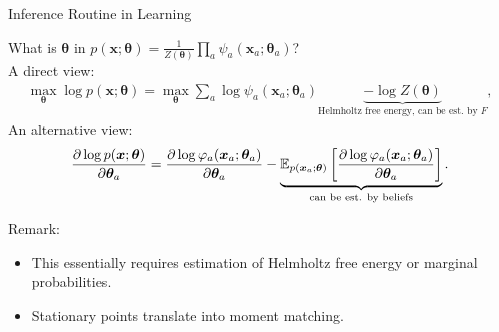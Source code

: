 \begin{frame}[label=current]{\large Inference Routine in Learning}
  
  What is $\bm{\theta}$ in $p(\bm{x}; \bm{\theta}) = \frac{1}{Z(\bm{\theta})} \prod_{a} \psi_a(\bm{x}_a; \bm{\theta}_a)$? \\
  A direct view:
  \begin{align*}
    \max_{\bm{\theta}} \log{p(\bm{x}; \bm{\theta})} =  \max_{\bm{\theta}}\sum_{a}\log{ \psi_a(\bm{x}_a; \bm{\theta}_a) } \underbrace{- \log{Z(\bm{\theta})}}_{\text{Helmholtz free energy, can be est. by $F$}},
  \end{align*}
  An alternative view:
  \begin{align*}
    \frac{ \partial \log{p}(\bm{x};\bm{\theta})}{\partial \bm{\theta}_a} = \frac{ \partial \log{{\varphi_a}(\bm{x}_a; \bm{\theta}_a)}}{\partial \bm{\theta}_a} - \underbrace{\mathbb{E}_{p(\bm{x}_a; \bm{\theta})}\left[ \frac{ \partial \log{{\varphi_a}(\bm{x}_a; \bm{\theta}_a)}}{\partial \bm{\theta}_a} \right]}_{\text{can be est. by beliefs}}.
  \end{align*}

  Remark:
  \begin{itemize}[label={$\bullet$}]
  \item This essentially requires estimation of Helmholtz free energy or marginal probabilities.
  \item Stationary points translate into moment matching.
  \end{itemize}
\end{frame}


